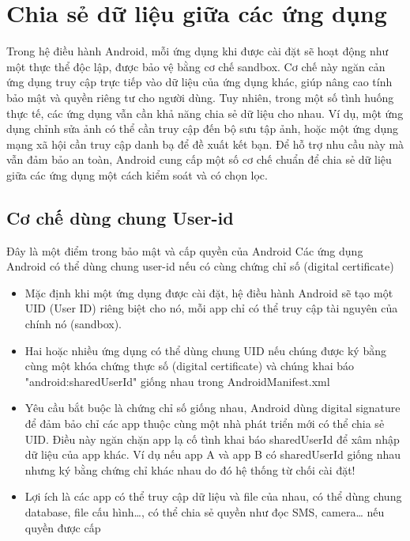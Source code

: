 \section{Chia sẻ dữ liệu giữa các ứng dụng}

\begin{flushleft}
  \hspace*{0.8cm}Trong hệ điều hành Android, mỗi ứng dụng khi được cài đặt sẽ hoạt động như một thực thể độc lập, được bảo vệ bằng cơ chế sandbox. Cơ chế này ngăn cản ứng dụng truy cập trực tiếp vào dữ liệu của ứng dụng khác, giúp nâng cao tính bảo mật và quyền riêng tư cho người dùng. Tuy nhiên, trong một số tình huống thực tế, các ứng dụng vẫn cần khả năng chia sẻ dữ liệu cho nhau. Ví dụ, một ứng dụng chỉnh sửa ảnh có thể cần truy cập đến bộ sưu tập ảnh, hoặc một ứng dụng mạng xã hội cần truy cập danh bạ để đề xuất kết bạn. Để hỗ trợ nhu cầu này mà vẫn đảm bảo an toàn, Android cung cấp một số cơ chế chuẩn để chia sẻ dữ liệu giữa các ứng dụng một cách kiểm soát và có chọn lọc.
\end{flushleft}

\subsection{Cơ chế dùng chung User-id}
\renewcommand{\labelitemi}{--}    
    \begin{flushleft}
        \hspace*{0.8cm}Đây là một điểm trong bảo mật và cấp quyền của Android Các ứng dụng Android có thể dùng chung user-id nếu có cùng chứng chỉ số (digital certificate)
        \setlength{\leftmargini}{1.5cm}
        \begin{itemize}
            \item Mặc định khi một ứng dụng được cài đặt, hệ điều hành Android sẽ tạo một UID (User ID) riêng biệt cho nó, mỗi app chỉ có thể truy cập tài nguyên của chính nó (sandbox).
            \item Hai hoặc nhiều ứng dụng có thể dùng chung UID nếu chúng được ký bằng cùng một khóa chứng thực số (digital certificate) và chúng khai báo "android:sharedUserId" giống nhau trong AndroidManifest.xml
            \item Yêu cầu bắt buộc là chứng chỉ số giống nhau, Android dùng digital signature để đảm bảo chỉ các app thuộc cùng một nhà phát triển mới có thể chia sẻ UID. Điều này ngăn chặn app lạ cố tình khai báo sharedUserId để xâm nhập dữ liệu của app khác.
            Ví dụ nếu app A và app B có sharedUserId giống nhau nhưng ký bằng chứng chỉ khác nhau do đó hệ thống từ chối cài đặt!
            \item Lợi ích là các app có thể truy cập dữ liệu và file của nhau, có thể dùng chung database, file cấu hình…, có thể chia sẻ quyền như đọc SMS, camera… nếu quyền được cấp
        \end{itemize}
    \end{flushleft}
\newpage
